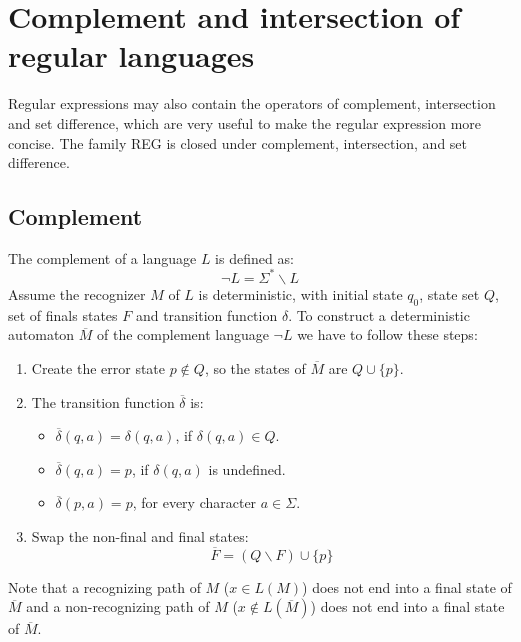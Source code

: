 \section{Complement and intersection of regular languages}

Regular expressions may also contain the operators of complement, intersection and set difference, which are very useful to make the regular expression more concise. 
The family REG is closed under complement, intersection, and set difference. 

\subsection*{Complement}
The complement of a language $L$ is defined as: 
\[\lnot L = \Sigma^{*} \backslash L\]
Assume the recognizer $M$ of $L$ is deterministic, with initial state $q_0$, state set $Q$, set of finals states $F$ and transition function $\delta$. 
To construct a deterministic automaton $\overline{M}$ of the complement language $\lnot L$ we have to follow these steps: 
\begin{enumerate}
    \item Create the error state $p \notin Q$, so the states of $\overline{M}$ are $Q \cup \{ p \}$. 
    \item The transition function $\overline{\delta}$ is: 
        \begin{itemize}
            \item $\overline{\delta}(q,a)=\delta(q,a)$, if $\delta(q,a) \in Q$. 
            \item $\overline{\delta}(q,a)=p$, if $\delta(q,a)$ is undefined. 
            \item $\overline{\delta}(p,a)=p$, for every character $a \in \Sigma$. 
        \end{itemize}
    \item Swap the non-final and final states: 
        \[\overline{F}=(Q \backslash F) \cup \{p\}\]
\end{enumerate}
Note that a recognizing path of $M$ ($x \in L(M)$) does not end into a final state of $\overline{M}$ and a non-recognizing path of $M$ ($x \notin L(\overline{M})$) does not end into a final state of $\overline{M}$.
